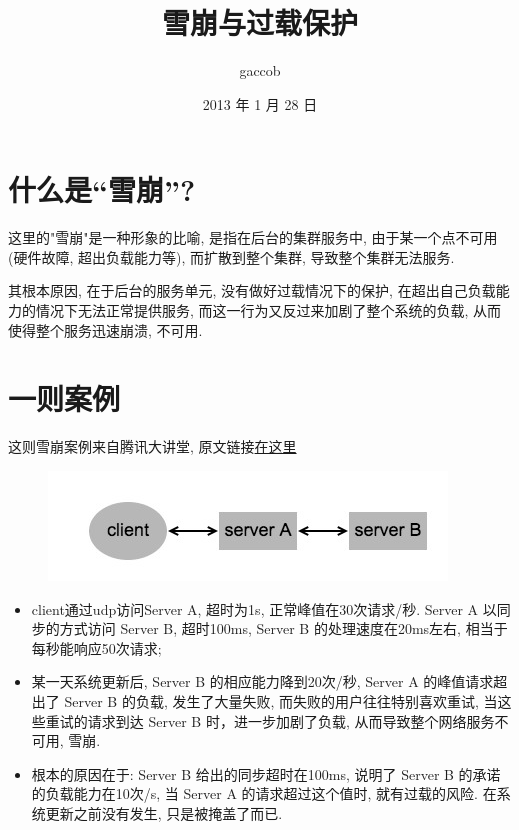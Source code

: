 

\title {\ZHH \huge 雪崩与过载保护}
\author {\small gaccob}
\date {\small 2013 年 1 月 28 日}
\maketitle

\section {\ZHH 什么是“雪崩”? } {
    { 这里的"雪崩"是一种形象的比喻, 是指在后台的集群服务中, 由于某一个点不可用(硬件故障, 超出负载能力等), 而扩散到整个集群, 导致整个集群无法服务. } \par
    { 其根本原因, 在于后台的服务单元, 没有做好过载情况下的保护, 在超出自己负载能力的情况下无法正常提供服务, 而这一行为又反过来加剧了整个系统的负载, 从而使得整个服务迅速崩溃, 不可用. } \par
}

\gaccobsplitinv

\section {\ZHH 一则案例} {
    { 这则雪崩案例来自腾讯大讲堂, 原文链接\href{http://djt.qq.com/article/view/156}{在这里} } \par
    \begin {figure}[htbp]
        \centering
        \includegraphics [width=300pt, keepaspectratio] {case.jpg}
    \end {figure}
    \begin{itemize}
        \item { client通过udp访问Server A, 超时为1s, 正常峰值在30次请求/秒.  Server A 以同步的方式访问 Server B, 超时100ms,  Server B 的处理速度在20ms左右, 相当于每秒能响应50次请求; }
        \item { 某一天系统更新后,  Server B 的相应能力降到20次/秒, Server A 的峰值请求超出了 Server B 的负载, 发生了大量失败, 而失败的用户往往特别喜欢重试, 当这些重试的请求到达 Server B 时，进一步加剧了负载, 从而导致整个网络服务不可用, 雪崩. }
        \item { 根本的原因在于:  Server B 给出的同步超时在100ms, 说明了 Server B 的承诺的负载能力在10次/s, 当 Server A 的请求超过这个值时, 就有过载的风险. 在系统更新之前没有发生, 只是被掩盖了而已. }
    \end{itemize}
}

